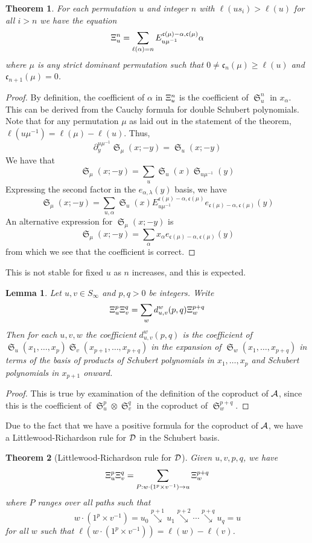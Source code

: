 \documentclass{elsarticle}
\newtheorem{lemma}{Lemma}[section]
\newtheorem{theorem}{Theorem}[section]
\theoremstyle{definition}
\theoremstyle{remark}
\numberwithin{equation}{subsection}
\DeclareMathOperator{\sch}{\mathfrak{S}}
\newcommand{\downvar}[1]{\stackrel{#1}{\searrow}}
\newcommand{\code}{\mathfrak{c}}
\begin{document}
\begin{theorem}
	For each permutation $u$ and integer $n$ with $\ell(us_i)>\ell(u)$ for all $i>n$ we have the equation
	$$\dsch_u^{n} = \sum_{\ell(\alpha)=n} E^{\code(\mu)-\alpha,\code(\mu)}_{u\mu^{-1}}\alpha$$
	where $\mu$ is any strict dominant permutation such that $0\neq \code_n(\mu) \geq \ell(u)$ and $\code_{n+1}(\mu)=0$.
\end{theorem}
\begin{proof}
	By definition, the coefficient of $\alpha$ in $\Xi_u^n$ is the coefficient of $\sch_u^n$ in $x_\alpha$. This can be derived from the Cauchy formula for double Schubert polynomials. Note that for any permutation $\mu$ as laid out in the statement of the theorem, $\ell(u\mu^{-1})=\ell(\mu)-\ell(u)$. Thus,
	$$\partial_y^{u\mu^{-1}}\sch_\mu(x;-y) = \sch_u(x;-y)$$
	We have that
	$$\sch_\mu(x;-y)=\sum_u \sch_u(x)\sch_{u\mu^{-1}}(y)$$
	Expressing the second factor in the $e_{\alpha,\lambda}(y)$ basis, we have
	$$\sch_\mu(x;-y)=\sum_{u,\alpha} \sch_u(x)E_{u\mu^{-1}}^{\code(\mu)-\alpha,\code(\mu)}e_{\code(\mu)-\alpha,\code(\mu)}(y)$$
	An alternative expression for $\sch_\mu(x;-y)$ is
	$$\sch_\mu(x;-y)=\sum_{\alpha} x_\alpha e_{\code(\mu)-\alpha,\code(\mu)}(y)$$
	from which we see that the coefficient is correct.
\end{proof}

This is not stable for fixed $u$ as $n$ increases, and this is expected.




\begin{lemma}
	Let $u,v\in S_\infty$ and $p,q>0$ be integers. Write
	$$\Xi_u^p\Xi_v^q = \sum_w d_{u,v}^w(p,q)\Xi_w^{p+q}$$
	Then for each $u,v,w$ the coefficient $d_{u,v}^w(p,q)$ is the coefficient of $\sch_u(x_1,\ldots,x_p)\sch_v(x_{p+1},\ldots,x_{p+q})$ in the expansion of $\sch_w(x_1,\ldots,x_{p+q})$ in terms of the basis of products of Schubert polynomials in $x_1,\ldots,x_p$ and Schubert polynomials in $x_{p+1}$ onward.
\end{lemma}
\begin{proof}
	This is true by examination of the definition of the coproduct of $\mathcal{A}$, since this is the coefficient of $\sch_u^p\otimes \sch_v^q$ in the coproduct of $\sch_w^{p+q}$.
\end{proof}



Due to the fact that we have a positive formula for the coproduct of $\mathcal{A}$, we have a Littlewood-Richardson rule for $\mathcal{D}$ in the Schubert basis.
\begin{theorem}[Littlewood-Richardson rule for $\mathcal{D}$]
	Given $u,v,p,q$, we have
	$$\Xi_u^{p}\Xi_v^{q} = \sum_{P:w\cdot (1^p\times v^{-1})\to u}\Xi_w^{p+q}$$
	where $P$ ranges over all paths such that
	$$w\cdot (1^p\times v^{-1}) = u_0\downvar{p+1} u_1\downvar{p+2}\cdots\downvar{p+q} u_q = u$$
	for all $w$ such that $\ell(w\cdot (1^p\times v^{-1})) = \ell(w) - \ell(v)$.
\end{theorem}
\end{document}
